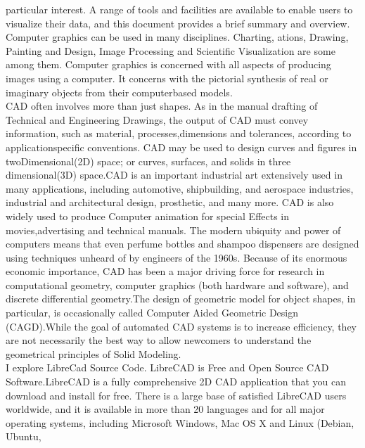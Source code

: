 particular  interest. A  range  of  tools
and  facilities  are  available  to  enable  users  to  visualize  their  data,  and  this  document  provides  a  brief
summary  and  overview.  Computer  graphics  can  be  used  in  many  disciplines.  Charting,  ations,
Drawing,  Painting  and  Design,  Image  Processing  and  Scientific  Visualization  are  some  among  them.
Computer  graphics  is concerned with all aspects of producing images using a computer. It concerns with
the pictorial synthesis of real or imaginary objects from their computer­based models.\\
  CAD  often  involves  more  than  just  shapes.  As  in  the  manual  drafting  of  Technical  and  Engineering
Drawings,  the  output  of  CAD  must  convey  information,  such  as  material,  processes,dimensions  and
tolerances,  according  to  application­specific  conventions.  CAD  may  be  used  to  design  curves  and
figures  in  two­Dimensional(2D)  space;  or  curves,  surfaces,  and  solids  in  three  dimensional(3D)
space.CAD  is  an  important  industrial  art  extensively  used  in  many  applications,  including  automotive,
shipbuilding,  and  aerospace  industries,  industrial  and  architectural  design, prosthetic,  and  many  more.
CAD  is  also  widely  used  to  produce  Computer  animation  for  special  Effects  in  movies,advertising  and
technical  manuals.  The  modern  ubiquity  and  power  of  computers  means  that  even  perfume  bottles  and
shampoo  dispensers  are  designed  using   techniques unheard of by engineers of the 1960s. Because  of its
enormous  economic  importance,  CAD  has  been  a  major  driving  force  for  research  in  computational
geometry,  computer  graphics  (both  hardware  and  software),  and  discrete  differential  geometry.The
design  of  geometric  model  for  object  shapes,  in  particular,  is  occasionally  called  Computer ­Aided
Geometric  Design  (CAGD).While  the  goal  of  automated  CAD  systems  is to increase efficiency, they are
not  necessarily  the  best  way   to  allow  newcomers  to  understand  the  geometrical  principles  of  Solid
Modeling.\\
  I  explore  LibreCad  Source  Code.  LibreCAD is Free and Open Source CAD Software.LibreCAD is
a  fully  comprehensive  2D  CAD   application  that  you  can  download  and  install  for  free.  There  is  a  large
base  of  satisfied  LibreCAD   users  worldwide,  and  it  is  available  in  more  than  20  languages  and  for  all
major  operating  systems,  including  Microsoft  Windows,  Mac  OS  X  and  Linux  (Debian,  Ubuntu,
